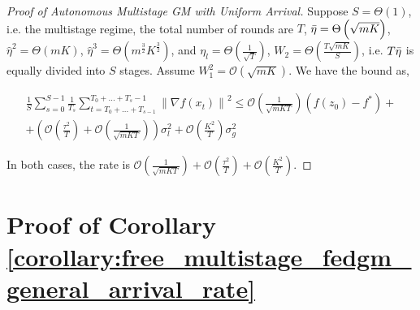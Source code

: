 \begin{proof}[Proof of Autonomous Multistage GM with Uniform Arrival]
Suppose $S=\Theta(1)$, i.e. the multistage regime, the total number of rounds are $T$, $\Bar{\eta} = \Theta\left(\sqrt{mK}\right)$, $\hat{\eta}^2 = \Theta\left(mK\right)$, $\hat{\eta}^3 = \Theta\left(m^{\frac{3}{2}} K^{\frac{3}{2}}\right)$, and  $\eta_l=\Theta\left(\frac{1}{\sqrt{T}}\right)$, $W_2=\Theta\left(\frac{T\sqrt{mK}}{S}\right)$, i.e. $T\Bar{\eta}$ is equally divided into $S$ stages. Assume $W_1^2=\mathcal{O}\left(\sqrt{mK}\right)$. We have the bound as,

\begin{equation}
\begin{gathered}
 \frac{1}{S}\sum_{s=0}^{S-1} \frac{1}{T_s}\sum_{t=T_0+\dots+T_{s-1} }^{T_0+\dots+T_s-1} \left\|\nabla f(x_t)\right\|^2
\leq \mathcal{O}\left(\frac{1}{\sqrt{mKT}}\right) \left(f(z_0) - f^\ast  \right) + \\
+\left( \mathcal{O}\left(\frac{\tau^2}{T}\right) + \mathcal{O}\left(\frac{1}{\sqrt{mKT}} \right) \right)\sigma_l^2 +  \mathcal{O}\left( \frac{K^2}{T} \right)  \sigma_g^2
\end{gathered}\nonumber
\end{equation}

In both cases, the rate is $\mathcal{O}\left(\frac{1}{\sqrt{mKT}}\right)+\mathcal{O}\left(\frac{\tau^2}{T}\right)+\mathcal{O}\left( \frac{K^2}{T} \right)$.

\end{proof}

\section{Proof of Corollary \ref{corollary:free_multistage_fedgm_general_arrival_rate}}
\label{sec:proof_free_multistage_fedgm_general_arrival}

